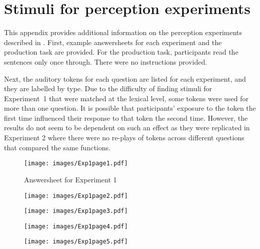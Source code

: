 \chapter{Stimuli for perception experiments}\label{appen:stimuli}

\noindent This appendix provides additional information on the perception experiments described in  .  First, example answersheets for each experiment and the production task are provided.  For the production task, participants read the sentences only once through.  There were no instructions provided.  

Next, the auditory tokens for each question are listed for each experiment, and they are labelled by type.  Due to the difficulty of finding stimuli for Experiment~1 that were matched at the lexical level, some tokens were used for more than one question.  It is possible that participants' exposure to the token the first time influenced their response to that token the second time.  However, the results do not seem to be dependent on such an effect as they were replicated in Experiment 2 where there were no re-plays of tokens across different questions that compared the same functions.




\begin{figure}[htbp]
	\centering
		\texttt{[image: images/Exp1page1.pdf]}
		\caption{Answersheet for Experiment 1}
		\label{x1p1}
\end{figure}

\begin{figure}[htbp]
	\centering
		\texttt{[image: images/Exp1page2.pdf]}
		\label{x1p2}
\end{figure}

\begin{figure}[htbp]
	\centering
		\texttt{[image: images/Exp1page3.pdf]}
		\label{x1p3}
\end{figure}

\begin{figure}[htbp]
	\centering
		\texttt{[image: images/Exp1page4.pdf]}
		\label{x1p4}
\end{figure}

\begin{figure}[htbp]
	\centering
		\texttt{[image: images/Exp1page5.pdf]}
		\label{x1p5}
\end{figure}


